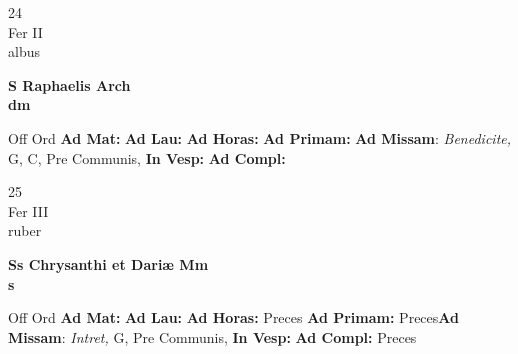 \documentclass[10pt, openany]{book}
\begin{document}
    \begin{center}
        \begin{minipage}{3.5in}
            \vspace{2em}
            \begin{minipage}{0.5in}
                {\Huge 24} \\
                {\normalsize Fer II} \\
                {\normalsize albus}
            \end{minipage}
            \begin{minipage}{3.0in}
                \textbf{ \large S Raphaelis Arch \\
                \textnormal{\normalsize dm}} \\ 
            \end{minipage}
            \begin{justify}Off Ord
                \textbf{Ad Mat: }
                \textbf{Ad Lau: }
                \textbf{Ad Horas: }
                \textbf{Ad Primam: }\textbf{Ad Missam}: \textit{Benedicite,} G, C, Pre Communis,  
                \textbf{In Vesp: }
                \textbf{Ad Compl: }
            \end{justify}
        \end{minipage}
    \end{center}

    \begin{center}
        \begin{minipage}{3.5in}
            \vspace{2em}
            \begin{minipage}{0.5in}
                {\Huge 25} \\
                {\normalsize Fer III} \\
                {\normalsize ruber}
            \end{minipage}
            \begin{minipage}{3.0in}
                \textbf{ \large Ss Chrysanthi et Dariæ Mm \\
                \textnormal{\normalsize s}} \\ 
            \end{minipage}
            \begin{justify}Off Ord
                \textbf{Ad Mat: }
                \textbf{Ad Lau: }
                \textbf{Ad Horas: }Preces
                \textbf{Ad Primam: }Preces\textbf{Ad Missam}: \textit{Intret,} G, Pre Communis,  
                \textbf{In Vesp: }
                \textbf{Ad Compl: }Preces
            \end{justify}
        \end{minipage}
    \end{center}
\end{document}
